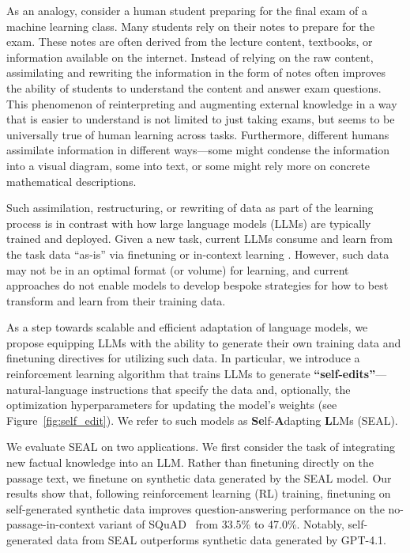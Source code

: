 \documentclass{article}
\newcommand{\methodacronym}{SEAL\xspace}
\begin{document}
As an analogy, consider a human student preparing for the final exam of a machine learning class. Many students rely on their notes to prepare for the exam. These notes are often derived from the lecture content, textbooks, or information available on the internet. Instead of relying on the raw content, assimilating and rewriting the information in the form of notes often improves the ability of students to understand the content and answer exam questions. This phenomenon of reinterpreting and augmenting external knowledge in a way that is easier to understand is not limited to just taking exams, but seems to be universally true of human learning across tasks. Furthermore, different humans assimilate information in different ways---some might condense the information into a visual diagram, some into text, or some might rely more on concrete mathematical descriptions. 

Such assimilation, restructuring, or rewriting of data as part of the learning process is in contrast with how large language models (LLMs) are typically trained and deployed. Given a new task, current LLMs consume and learn from the task data ``as-is'' via finetuning or in-context learning \citep{wei2022finetuned,rozière2024codellamaopenfoundation,chen2023meditron70bscalingmedicalpretraining,colombo2024saullm7bpioneeringlargelanguage}. However, such data may not be in an optimal format (or volume) for learning, and current approaches do not enable models to develop bespoke strategies for how to best transform and learn from their training data.

As a step towards scalable and efficient adaptation of language models, we propose equipping LLMs with the ability to generate their own training data and finetuning directives for utilizing such data. In particular, we introduce a reinforcement learning algorithm that trains LLMs to generate \textbf{``self-edits''}---natural-language instructions that specify the data and, optionally, the optimization hyperparameters for updating the model's weights (see Figure~\ref{fig:self_edit}). We refer to such models as \textbf{Se}lf-\textbf{A}dapting \textbf{L}LMs (\methodacronym).  

We evaluate \methodacronym on two applications. We first consider the task of integrating new factual knowledge into an LLM. Rather than finetuning directly on the passage text, we finetune on synthetic data generated by the \methodacronym model. Our results show that, following reinforcement learning (RL) training, finetuning on self-generated synthetic data improves question-answering performance on the no-passage-in-context variant of SQuAD~\citep{rajpurkar2016squad} from 33.5\% to 47.0\%. Notably, self-generated data from \methodacronym outperforms synthetic data generated by GPT-4.1.
\end{document}
